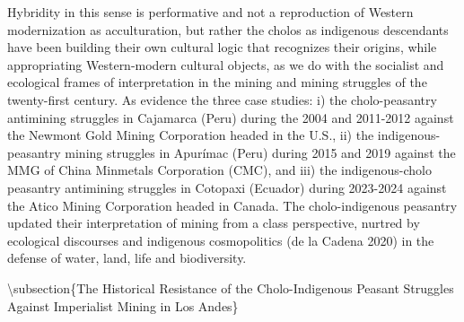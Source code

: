 \documentclass[
]{article}
\begin{document}
Hybridity in this sense is performative and not a reproduction of
Western modernization as acculturation, but rather the cholos as
indigenous descendants have been building their own cultural logic that
recognizes their origins, while appropriating Western-modern cultural
objects, as we do with the socialist and ecological frames of
interpretation in the mining and mining struggles of the twenty-first
century. As evidence the three case studies: i) the cholo-peasantry
antimining struggles in Cajamarca (Peru) during the 2004 and 2011-2012
against the Newmont Gold Mining Corporation headed in the U.S., ii) the
indigenous-peasantry mining struggles in Apurímac (Peru) during 2015 and
2019 against the MMG of China Minmetals Corporation (CMC), and iii) the
indigenous-cholo peasantry antimining struggles in Cotopaxi (Ecuador)
during 2023-2024 against the Atico Mining Corporation headed in Canada.
The cholo-indigenous peasantry updated their interpretation of mining
from a class perspective, nurtred by ecological discourses and
indigenous cosmopolitics (de la Cadena 2020) in the defense of water,
land, life and biodiversity.

\textbackslash subsection\{The Historical Resistance of the
Cholo-Indigenous Peasant Struggles Against Imperialist Mining in Los
Andes\}
\end{document}
